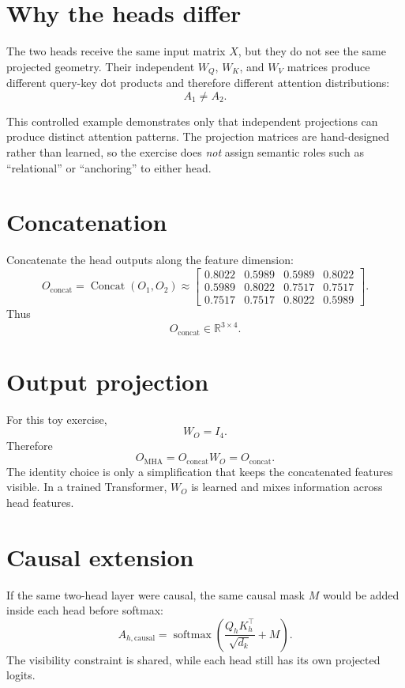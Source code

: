 \documentclass[11pt]{article}
\newcommand{\softmax}{\operatorname{softmax}}
\newcommand{\Concat}{\operatorname{Concat}}
\begin{document}
\section*{Why the heads differ}

The two heads receive the same input matrix $X$, but they do not see the same projected geometry. Their independent $W_Q$, $W_K$, and $W_V$ matrices produce different query-key dot products and therefore different attention distributions:
\[
A_1\neq A_2.
\]

This controlled example demonstrates only that independent projections can produce distinct attention patterns. The projection matrices are hand-designed rather than learned, so the exercise does \emph{not} assign semantic roles such as ``relational'' or ``anchoring'' to either head.

\section*{Concatenation}

Concatenate the head outputs along the feature dimension:
\[
O_{\mathrm{concat}}=\Concat(O_1,O_2)
\approx
\begin{bmatrix}
0.8022&0.5989&0.5989&0.8022\\
0.5989&0.8022&0.7517&0.7517\\
0.7517&0.7517&0.8022&0.5989
\end{bmatrix}.
\]
Thus
\[
O_{\mathrm{concat}}\in\mathbb{R}^{3\times4}.
\]

\section*{Output projection}

For this toy exercise,
\[
W_O=I_4.
\]
Therefore
\[
O_{\mathrm{MHA}}=O_{\mathrm{concat}}W_O=O_{\mathrm{concat}}.
\]
The identity choice is only a simplification that keeps the concatenated features visible. In a trained Transformer, $W_O$ is learned and mixes information across head features.

\section*{Causal extension}

If the same two-head layer were causal, the same causal mask $M$ would be added inside each head before softmax:
\[
A_{h,\mathrm{causal}}
=
\softmax\left(
\frac{Q_hK_h^\top}{\sqrt{d_k}}+M
\right).
\]
The visibility constraint is shared, while each head still has its own projected logits.
\end{document}
